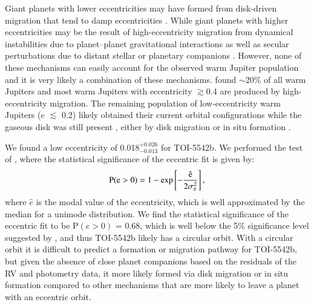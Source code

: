 \documentclass{aa}
\begin{document}
Giant planets with lower eccentricities may have formed from disk-driven migration \citep[e.g.,][]{Goldreich1980,Ward1997,Baruteau2014} that tend to damp eccentricities \citep{Bitsch2013,Dunhill2013}. While giant planets with higher eccentricities may be the result of high-eccentricity migration from dynamical instabilities due to planet–planet gravitational interactions \citep[e.g.,][]{Rasio1996,Weidenschilling1996,LinIda1997} as well as secular perturbations due to distant stellar \citep[e.g.,][]{Wu2003,Fabrycky2007} or planetary companions \citep[e.g.,][]{Naoz2011,Wu2011}. However, none of these mechanisms can easily account for the observed warm Jupiter population and it is very likely a combination of these mechanisms. \citet{Petrovich2016} found $\sim$20\% of all warm Jupiters and most warm Jupiters with eccentricity $\gtrsim$0.4 are produced by high-eccentricity migration. The remaining population of low-eccentricity warm Jupiters ($e$ $\lesssim$ 0.2) likely obtained their current orbital configurations while the gaseous disk was still present \citep{Petrovich2016}, either by disk migration \citep[e.g.,][]{Goldreich1980} or in situ formation \citep[e.g.,][]{Batygin2016,Boley2016,Huang2016}.

We found a low eccentricity of 0.018$^{+0.026}_{-0.013}$ for TOI-5542b. We performed the test of \citet{Lucy1971}, where the statistical significance of the eccentric fit is given by:
\begin{equation}
    \rm{P}(e > 0) = 1 - \rm{exp}\left[ - \frac{\hat{e}}{2\sigma^{2}_{e}}\right],
\end{equation}
where $\hat{e}$ is the modal value of the eccentricity, which is well approximated by the median for a unimode distribution. We find the statistical significance of the eccentric fit to be P$(e > 0)$ = 0.68, which is well below the 5\% significance level suggested by \citet{Lucy1971}, and thus TOI-5542b likely has a circular orbit. With a circular orbit it is difficult to predict a formation or migration pathway for TOI-5542b, but given the absence of close planet companions based on the residuals of the RV and photometry data, it more likely formed via disk migration or in situ formation compared to other mechanisms that are more likely to leave a planet with an eccentric orbit.
\end{document}
